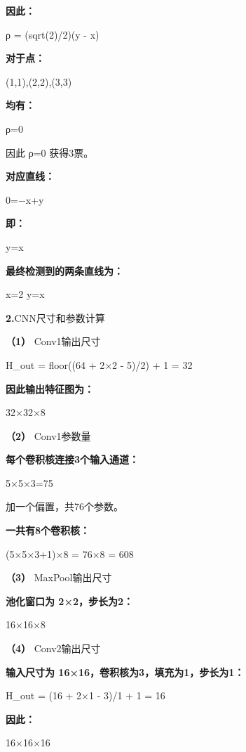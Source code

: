 \documentclass[UTF8,openany,oneside,zihao=-4,fontset=windows]{ctexbook}
\newcommand{\Question}[2]{%
  \par\Needspace{4\baselineskip}\medskip
  \noindent\textbf{\color{MVBlue}#1}\quad #2\par
}
\begin{document}
\par\noindent\textbf{因此：}
\begin{center}\small\ttfamily ρ = (sqrt(2)/2)(y - x)\end{center}
\par\noindent\textbf{对于点：}
\par (1,1),(2,2),(3,3)
\par\noindent\textbf{均有：}
\par ρ=0
\par 因此 ρ=0 获得3票。
\par\noindent\textbf{对应直线：}
\par 0=−x+y
\par\noindent\textbf{即：}
\par y=x
\par\noindent\textbf{最终检测到的两条直线为：}
\begin{center}\small\ttfamily x=2 y=x\end{center}
\Question{2.}{CNN尺寸和参数计算}
\par\noindent\textbf{（1）} Conv1输出尺寸
\begin{center}\small\ttfamily H\_out = floor((64 + 2×2 - 5)/2) + 1 = 32\end{center}
\par\noindent\textbf{因此输出特征图为：}
\par 32×32×8
\par\noindent\textbf{（2）} Conv1参数量
\par\noindent\textbf{每个卷积核连接3个输入通道：}
\par 5×5×3=75
\par 加一个偏置，共76个参数。
\par\noindent\textbf{一共有8个卷积核：}
\begin{center}\small\ttfamily (5×5×3+1)×8 = 76×8 = 608\end{center}
\par\noindent\textbf{（3）} MaxPool输出尺寸
\par\noindent\textbf{池化窗口为 2×2，步长为2：}
\par 16×16×8
\par\noindent\textbf{（4）} Conv2输出尺寸
\par\noindent\textbf{输入尺寸为 16×16，卷积核为3，填充为1，步长为1：}
\begin{center}\small\ttfamily H\_out = (16 + 2×1 - 3)/1 + 1 = 16\end{center}
\par\noindent\textbf{因此：}
\par 16×16×16
\end{document}
